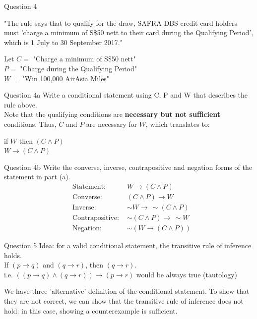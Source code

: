 \documentclass[10pt]{beamer}
\begin{document}
\begin{frame}[fragile]{Question 4}
\begin{center}
    "The rule says that to qualify for the draw, SAFRA-DBS credit card holders must
'charge a minimum of S\$50 nett to their card during the Qualifying Period', which is
1 July to 30 September 2017."
\end{center}
    Let $C =$ "Charge a minimum of S\$50 nett" \\
    $P =$ "Charge during the Qualifying Period" \\
    $W =$ "Win 100,000 AirAsia Miles"
\end{frame}

\begin{frame}[fragile]{Question 4a}
    Write a conditional statement using C, P and W that describes the rule above. \\
    Note that the qualifying conditions are \textbf{necessary but not sufficient} conditions. Thus, $C$ and $P$ are necessary for $W$, which translates to:
    \begin{center}
        if $W$ then $(C \land P)$ \\
        $W \rightarrow (C \land P)$
    \end{center}
\end{frame}

\begin{frame}[fragile]{Question 4b}
    Write the converse, inverse, contrapositive and negation forms of the statement in part (a).
    \begin{align*}
        &\text{Statement: } &W \rightarrow (C \land P) \\
        &\text{Converse: } &(C \land P) \rightarrow W \\
        &\text{Inverse: } &\sim W \rightarrow \,\sim(C \land P) \\
        &\text{Contrapositive: } &\sim(C \land P) \rightarrow \,\sim W \\
        &\text{Negation: } &\sim(W \rightarrow (C \land P))
    \end{align*}
\end{frame}

\begin{frame}[fragile]{Question 5}
Idea: for a valid conditional statement, the transitive rule of inference holds. \\
If $(p \rightarrow q)$ and $(q \rightarrow r)$, then $(q \rightarrow r)$. \\
i.e. $((p \rightarrow q) \land (q \rightarrow r)) \rightarrow (p \rightarrow r)$ would be always true (tautology)

We have three 'alternative' definition of the conditional statement. To show that they are not correct, we can show that the transitive rule of inference does not hold: in this case, showing a counterexample is sufficient.
\end{frame}
\end{document}
